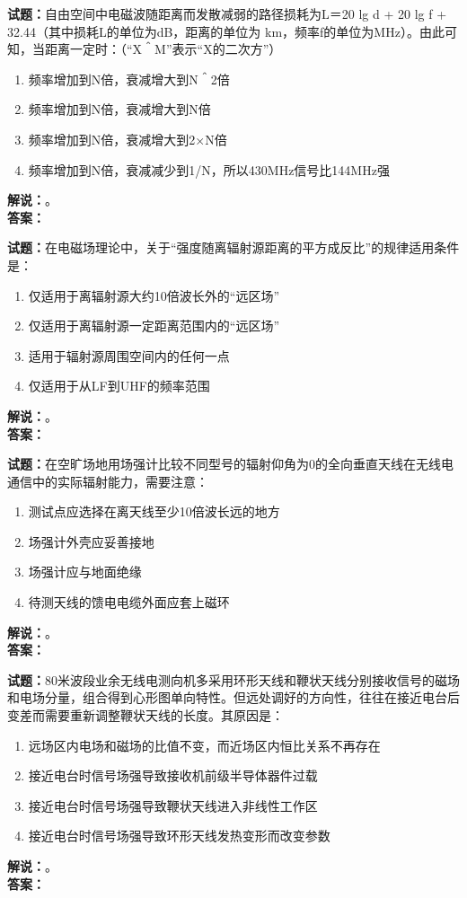 \documentclass{ctexbook}
\begin{document}
\bigskip

\noindent\textbf{试题：}自由空间中电磁波随距离而发散减弱的路径损耗为L＝20 lg d + 20 lg f + 32.44（其中损耗L的单位为dB，距离的单位为 km，频率f的单位为\unit{\MHz}）。由此可知，当距离一定时：（“X＾M”表示“X的二次方”）
\begin{enumerate}[leftmargin=3em]
  \item 频率增加到N倍，衰减增大到N＾2倍
  \item 频率增加到N倍，衰减增大到N倍
  \item 频率增加到N倍，衰减增大到2×N倍
  \item 频率增加到N倍，衰减减少到1/N，所以430\unit{\MHz}信号比144\unit{\MHz}强
\end{enumerate}
\noindent\textbf{解说：}\textbf{}。\\\noindent\textbf{答案：}

\bigskip

\noindent\textbf{试题：}在电磁场理论中，关于“强度随离辐射源距离的平方成反比”的规律适用条件是：
\begin{enumerate}[leftmargin=3em]
  \item 仅适用于离辐射源大约10倍波长外的“远区场”
  \item 仅适用于离辐射源一定距离范围内的“远区场”
  \item 适用于辐射源周围空间内的任何一点
  \item 仅适用于从LF到UHF的频率范围
\end{enumerate}
\noindent\textbf{解说：}\textbf{}。\\\noindent\textbf{答案：}

\bigskip

\noindent\textbf{试题：}在空旷场地用场强计比较不同型号的辐射仰角为0的全向垂直天线在无线电通信中的实际辐射能力，需要注意：
\begin{enumerate}[leftmargin=3em]
  \item 测试点应选择在离天线至少10倍波长远的地方
  \item 场强计外壳应妥善接地
  \item 场强计应与地面绝缘
  \item 待测天线的馈电电缆外面应套上磁环
\end{enumerate}
\noindent\textbf{解说：}\textbf{}。\\\noindent\textbf{答案：}

\bigskip

\noindent\textbf{试题：}80米波段业余无线电测向机多采用环形天线和鞭状天线分别接收信号的磁场和电场分量，组合得到心形图单向特性。但远处调好的方向性，往往在接近电台后变差而需要重新调整鞭状天线的长度。其原因是：
\begin{enumerate}[leftmargin=3em]
  \item 远场区内电场和磁场的比值不变，而近场区内恒比关系不再存在
  \item 接近电台时信号场强导致接收机前级半导体器件过载
  \item 接近电台时信号场强导致鞭状天线进入非线性工作区
  \item 接近电台时信号场强导致环形天线发热变形而改变参数
\end{enumerate}
\noindent\textbf{解说：}\textbf{}。\\\noindent\textbf{答案：}
\end{document}
